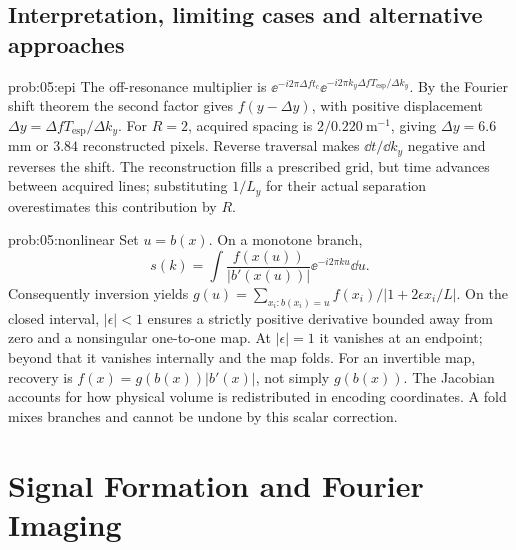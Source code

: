 \subsection{Interpretation, limiting cases and alternative approaches}
\begin{solution}{prob:05:epi}
The off-resonance multiplier is
\(\ee^{-i2\pi\Delta f t_c}
 \ee^{-i2\pi k_y\Delta f T_{\mathrm{esp}}/\Delta k_y}\).
By the Fourier shift theorem the second factor gives
\(f(y-\Delta y)\), with positive displacement
\(\Delta y=\Delta f T_{\mathrm{esp}}/\Delta k_y\).
For \(R=2\), acquired spacing is \(2/0.220\ \mathrm m^{-1}\), giving
\(\Delta y=6.6\) mm or \(3.84\) reconstructed pixels.
Reverse traversal makes \(\dd t/\dd k_y\) negative and reverses the shift.
The reconstruction fills a prescribed grid, but time advances between acquired lines; substituting \(1/L_y\) for their actual separation overestimates this contribution by \(R\).
\end{solution}
\begin{solution}{prob:05:nonlinear}
Set \(u=b(x)\). On a monotone branch,
\[
 s(k)=\int \frac{f(x(u))}{|b'(x(u))|}
             \ee^{-i2\pi ku}\dd u.
\]
Consequently inversion yields
\(g(u)=\sum_{x_i:b(x_i)=u}f(x_i)/|1+2\epsilon x_i/L|\).
On the closed interval, \(|\epsilon|<1\) ensures a strictly positive derivative bounded away from zero and a nonsingular one-to-one map.
At \(|\epsilon|=1\) it vanishes at an endpoint; beyond that it vanishes internally and the map folds.
For an invertible map, recovery is
\(f(x)=g(b(x))|b'(x)|\), not simply \(g(b(x))\).
The Jacobian accounts for how physical volume is redistributed in encoding coordinates. A fold mixes branches and cannot be undone by this scalar correction.
\end{solution}

\section{Signal Formation and Fourier Imaging}
\label{sec:e:signal-formation-and-fourier-imaging}
